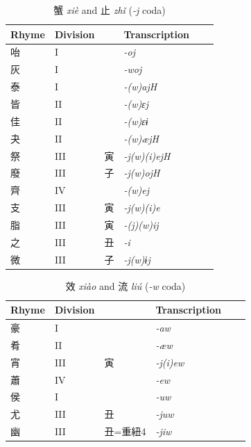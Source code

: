 \documentclass[oneside,a4paper,11pt]{article}
\newcommand{\ipa}[1]{{\phon\textit{#1}}}
\newcommand{\zh}[1]{{\cn #1}}
\newcommand{\zhc}[2]{\zh{#1} \ipa{#2}}
\begin{document}
\begin{table}[H]
\caption{\zhc{蟹}{xiè} and \zhc{止}{zhǐ} (\ipa{-j} coda)} \centering \label{tab:xie.zhi}
\begin{tabular}{llllll}
\toprule
Rhyme & Division & & Transcription \\
\midrule
\zh{咍} &	I &	&	\ipa{-oj} &	\\
\zh{灰} &	I &	&	\ipa{-woj} &	\\
\zh{泰} &	I &	&	\ipa{-(w)ajH} &	\\
\zh{皆} &	II &	&	\ipa{-(w)ɛj} &	\\
\zh{佳} &	II &	&	\ipa{-(w)ɛɨ} &	\\
\zh{夬} &	II &	&	\ipa{-(w)æjH} &	\\
\zh{祭} &	III &	\zh{寅} &	\ipa{-j(w)(i)ejH} &	\\
\zh{廢} &	III &	\zh{子} &	\ipa{-j(w)ojH} &	\\
\zh{齊} &	IV &	&	\ipa{-(w)ej} &	\\
\midrule
\zh{支} &	III &	\zh{寅} &	\ipa{-j(w)(i)e} &	\\
\zh{脂} &	III &	\zh{寅} &	\ipa{-(j)(w)ij} &	\\
\zh{之} &	III &	\zh{丑} &	\ipa{-i} &	\\
\zh{微} &	III &	\zh{子} &	\ipa{-j(w)ɨj} &	\\
\bottomrule
\end{tabular}
\end{table}


\begin{table}[H]
\caption{\zhc{效}{xiào} and \zhc{流}{liú} (\ipa{-w} coda)} \centering \label{tab:xiao}
\begin{tabular}{llllll}
\toprule
Rhyme & Division & & Transcription \\
\midrule
\zh{豪} &	I &	&	\ipa{-aw} &	\\
\zh{肴} &	II &	&	\ipa{-æw} &	\\
\zh{宵} &	III &	\zh{寅} &	\ipa{-j(i)ew} &	\\
\zh{蕭} &	IV &	&	\ipa{-ew} &	\\
\midrule
\zh{侯} &	I &	&	\ipa{-uw} &	\\
\zh{尤} &	III &	\zh{丑} &	\ipa{-juw} &	\\
\zh{幽} &	III &	\zh{丑}=\zh{重紐}4 &	\ipa{-jiw} &	\\
\bottomrule
\end{tabular}
\end{table}
\end{document}
